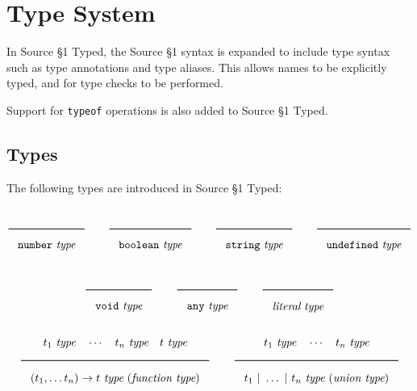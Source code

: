 \newcommand{\Rule}[2]{\genfrac{}{}{0.7pt}{}{{\setlength{\fboxrule}{0pt}\setlength{\fboxsep}{3mm}\fbox{$#1$}}}{{\setlength{\fboxrule}{0pt}\setlength{\fboxsep}{3mm}\fbox{$#2$}}}}

\newcommand{\TruE}{\textbf{\texttt{true}}}
\newcommand{\FalsE}{\textbf{\texttt{false}}}
\newcommand{\AndOp}{\texttt{\&\&}}
\newcommand{\OrOp}{\texttt{||}}
\newcommand{\ThenOp}{\texttt{?}}
\newcommand{\ElseOp}{\texttt{:}}
\newcommand{\Rc}{\texttt{\}}}
\newcommand{\Lc}{\texttt{\{}}
\newcommand{\Rp}{\texttt{)}}
\newcommand{\Lp}{\texttt{(}}
\newcommand{\Fun}{\textbf{\texttt{function}}}
\newcommand{\Let}{\textbf{\texttt{let}}}
\newcommand{\Return}{\textbf{\texttt{return}}}
\newcommand{\Const}{\textbf{\texttt{const}}}
\newcommand{\If}{\textbf{\texttt{if}}}
\newcommand{\Else}{\textbf{\texttt{else}}}
\newcommand{\Bool}{\texttt{boolean}}
\newcommand{\Number}{\texttt{number}}
\newcommand{\String}{\texttt{string}}
\newcommand{\Undefined}{\texttt{undefined}}
\newcommand{\Any}{\texttt{any}}
\newcommand{\Void}{\texttt{void}}
\newcommand{\Pred}{\textit{Pred}}
\newcommand{\type}{\textit{type}}
\newcommand{\polytype}{\textit{polytype}}
\newcommand{\predtype}{\textit{predtype}}
\newcommand{\ExtractPos}{\ensuremath{\textit{Extract}^+}}
\newcommand{\ExtractNeg}{\ensuremath{\textit{Extract}^-}}

\newtheorem{definition}{Definition}[section]

\section{Type System}  

In Source \S 1 Typed, the Source \S 1 syntax is expanded to include type syntax such as type annotations and type aliases.
This allows names to be explicitly typed, and for type checks to be performed.

Support for \texttt{typeof} operations is also added to Source \S 1 Typed.

\subsection{Types}

The following types are introduced in Source \S 1 Typed:

\noindent
\[
\Rule{}{\Number\ \type}
\qquad
\Rule{}{\Bool\ \type}
\qquad
\Rule{}{\String\ \type}
\qquad
\Rule{}{\Undefined\ \type}
\]
\noindent
\[
\Rule{}{\Void\ \type}
\qquad
\Rule{}{\Any\ \type}
\qquad
\Rule{}{\textit{literal}\ \type}
\]
\noindent
\[
\Rule{t_1\ \type \quad \cdots\quad t_n\ \type\quad t\ \type}{(t_1, \ldots t_n) \rightarrow t\ \type\ (\textit{function type})}
\qquad
\Rule{t_1\ \type \quad \cdots\quad t_n\ \type}{t_1\ |\ \ldots\ |\ t_n\ \type\ (\textit{union type})}
\]

